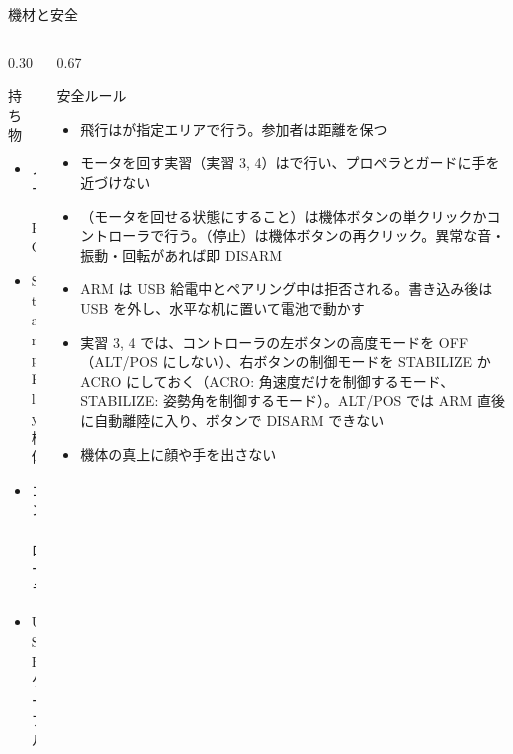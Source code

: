 \begin{frame}{機材と安全}
  \begin{columns}[T]
    \begin{column}{0.30\textwidth}
      \begin{block}{持ち物}
        \footnotesize
        \begin{itemize}\setlength{\itemsep}{1pt}
          \item ノート PC
          \item StampFly 機体
          \item コントローラ
          \item USB ケーブル
        \end{itemize}
      \end{block}
    \end{column}
    \begin{column}{0.67\textwidth}
      \begin{alertblock}{安全ルール}
        \scriptsize
        \begin{itemize}\setlength{\itemsep}{1pt}
          \item 飛行はが指定エリアで行う。参加者は距離を保つ
          \item モータを回す実習（実習 3, 4）はで行い、プロペラとガードに手を近づけない
          \item {}（モータを回せる状態にすること）は機体ボタンの単クリックかコントローラで行う。（停止）は機体ボタンの再クリック。異常な音・振動・回転があれば即 DISARM
          \item ARM は USB 給電中とペアリング中は拒否される。書き込み後は USB を外し、水平な机に置いて電池で動かす
          \item 実習 3, 4 では、コントローラの左ボタンの高度モードを OFF（ALT/POS にしない）、右ボタンの制御モードを STABILIZE か ACRO にしておく（ACRO: 角速度だけを制御するモード、STABILIZE: 姿勢角を制御するモード）。ALT/POS では ARM 直後に自動離陸に入り、ボタンで DISARM できない
          \item 機体の真上に顔や手を出さない
        \end{itemize}
      \end{alertblock}
    \end{column}
  \end{columns}
\end{frame}

